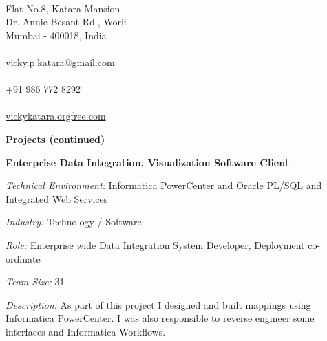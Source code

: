 \documentclass[a4paper,12pt,final]{memoir}
\newcommand{\Sep}{\vspace{1.5em}}
\newcommand{\SmallSep}{\vspace{0.5em}}
\newcommand{\CVSection}[1]
	{\Large\textbf{#1}\par
	\SmallSep\normalsize\normalfont}
\newcommand{\CVItem}[1]
	{\textbf{\color{Plum} #1}}
\begin{document}

\begin{flushright} 
	\footnotesize
	\SmallSep
	{\bfseries{\color{Plum}{Address}}}\\
	
	Flat No.8, Katara Mansion\\
	Dr. Annie Besant Rd., Worli\\
	Mumbai - 400018, India\\
	\Sep
	{\bfseries{\color{Plum}{EMail}}}\\
	\href{mailto:vicky.p.katara@gmail.com}{vicky.p.katara@gmail.com}\\
	\Sep
	{\bfseries{\color{Plum}{Cellphone}}}\\
	\href{tel:+919867728292}{+91 986 772 8292}\\
	\Sep
		{\bfseries{\color{Plum}{Website}}}\\
	\href{http://vickykatara.orgfree.com/}{vickykatara.orgfree.com}\\
\end{flushright}\normalsize
	\hspace{0.5cm}
	\vspace{-0.35cm}
	\vspace{-0.1cm}
	\hspace{-0.4cm}
\framebreak


\CVSection{Projects (continued)}
\CVItem{Enterprise Data Integration, Visualization Software Client}\SmallSep\\
\begin{minipage}{13cm}
	\begin{compactitem}[\color{Plum}$\circ$]
		{\footnotesize
			\item \emph{Technical Environment:} Informatica PowerCenter and Oracle PL/SQL and Integrated Web Services
			\item \emph{Industry:} Technology / Software
			\item \emph{Role:} Enterprise wide Data Integration System Developer, Deployment co-ordinate
			\item \emph{Team Size:} 31
			\item \emph{Description:} As part of this project I designed and built mappings using Informatica PowerCenter. I was also responsible to reverse engineer some interfaces and Informatica Workflows.
		}
	\end{compactitem}
\end{minipage}
\SmallSep\\
\end{document}
